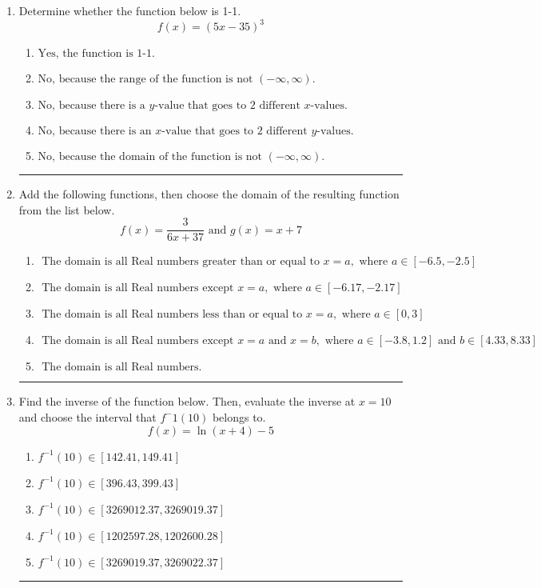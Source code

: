 \documentclass[14pt]{extbook}
\newcommand{\litem}[1]{\item#1\hspace*{-1cm}\rule{\textwidth}{0.4pt}}
\begin{document}
\begin{enumerate}
{\begin{enumerate}[label=\Alph*.]
\end{enumerate} }
\litem{
Determine whether the function below is 1-1.\[ f(x) = (5 x - 35)^3 \]\begin{enumerate}[label=\Alph*.]
\item \( \text{Yes, the function is 1-1.} \)
\item \( \text{No, because the range of the function is not $(-\infty, \infty)$.} \)
\item \( \text{No, because there is a $y$-value that goes to 2 different $x$-values.} \)
\item \( \text{No, because there is an $x$-value that goes to 2 different $y$-values.} \)
\item \( \text{No, because the domain of the function is not $(-\infty, \infty)$.} \)

\end{enumerate} }
\litem{
Add the following functions, then choose the domain of the resulting function from the list below.\[ f(x) = \frac{3}{6x+37} \text{ and } g(x) = x + 7 \]\begin{enumerate}[label=\Alph*.]
\item \( \text{ The domain is all Real numbers greater than or equal to } x = a, \text{ where } a \in [-6.5, -2.5] \)
\item \( \text{ The domain is all Real numbers except } x = a, \text{ where } a \in [-6.17, -2.17] \)
\item \( \text{ The domain is all Real numbers less than or equal to } x = a, \text{ where } a \in [0, 3] \)
\item \( \text{ The domain is all Real numbers except } x = a \text{ and } x = b, \text{ where } a \in [-3.8, 1.2] \text{ and } b \in [4.33, 8.33] \)
\item \( \text{ The domain is all Real numbers. } \)

\end{enumerate} }
\litem{
Find the inverse of the function below. Then, evaluate the inverse at $x = 10$ and choose the interval that $f^-1(10)$ belongs to.\[ f(x) = \ln{(x+4)}-5 \]\begin{enumerate}[label=\Alph*.]
\item \( f^{-1}(10) \in [142.41, 149.41] \)
\item \( f^{-1}(10) \in [396.43, 399.43] \)
\item \( f^{-1}(10) \in [3269012.37, 3269019.37] \)
\item \( f^{-1}(10) \in [1202597.28, 1202600.28] \)
\item \( f^{-1}(10) \in [3269019.37, 3269022.37] \)


\end{enumerate}}
\end{enumerate}
\end{document}
